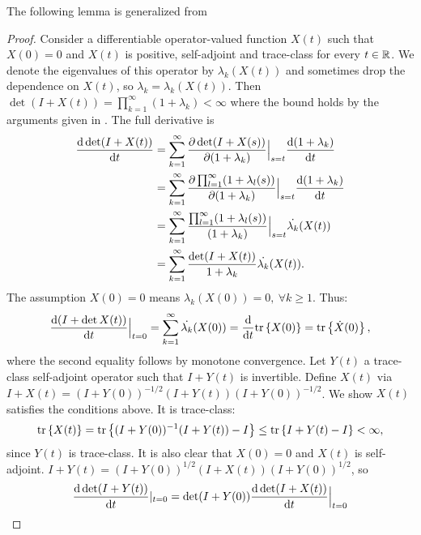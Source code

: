 \documentclass{amsart}
\numberwithin{equation}{section}
\begin{document}
The following lemma is generalized from \cite[Chapter 9,
  Theorem 4, pp. 127]{Lax97}
\lax
\begin{proof}
  Consider a differentiable operator-valued function $X(t)$ such that
  $X(0) = 0$ and $X(t)$ is positive, self-adjoint and trace-class for
  every $t\in \mathbb{R}$. We denote the eigenvalues of this operator by
  $\lambda_k(X(t))$ and sometimes drop the dependence on $X(t)$, so
  $\lambda_k = \lambda_k(X(t))$.  Then $\det (I+X(t)) =
  \prod_{k=1}^{\infty} (1+\lambda_k) < \infty$ where the bound holds
  by the arguments given in \cite{AlexanderianGloorGhattas14}. The
  full derivative is
  \begin{align*}
    \frac{\text{\textup{d}} \det (I+X(t))}{\text{\textup{d}} t} 
    &= \sum_{k=1}^{\infty} 
    \frac{\partial \det (I+X(s))}{\partial (1+\lambda_k)}\Big |_{s=t}
    \frac{\text{\textup{d}} (1+\lambda_k)}{\text{\textup{d}} t} \\
    &= \sum_{k=1}^{\infty} \frac{\partial \prod_{l=1}^{\infty}
      (1+\lambda_l(s))}{\partial (1+\lambda_k)}\Big |_{s=t}
    \frac{\text{\textup{d}} (1+\lambda_k)}{\text{\textup{d}} t} \\
    &= \sum_{k=1}^{\infty} \frac{\prod_{l=1}^{\infty}
      (1+\lambda_l(s))}{(1+\lambda_k)}\Big |_{s=t}
    \dot{\lambda_k}(X(t)) \\
    &= \sum_{k=1}^{\infty} \frac{\det (I+X(t))}{1 +\lambda_k} \dot{\lambda_k}(X(t)).
  \end{align*}
  The assumption $X(0) = 0$ means $\lambda_k(X(0)) = 0,\ \forall k \geq 1$. Thus:
  \begin{align*}
    \frac{\text{\textup{d}} (I+\det X(t))}{\text{\textup{d}} t}\Big |_{t=0} 
    = \sum_{k=1}^{\infty} \dot{\lambda_k}(X(0)) 
    = \frac{\text{\textup{d}} }{\text{\textup{d}} t}\textup{tr}\left \{X(0) \right \}
    = \textup{tr}\left \{\dot{X}(0) \right \},
  \end{align*}
  where the second equality follows by monotone convergence. 
  Let $Y(t)$ a trace-class self-adjoint operator such that 
  $I+Y(t)$ is invertible.
  Define $X(t)$ via $I+X(t) = (I+Y(0))^{-1/2} (I+Y(t)) (I+Y(0))^{-1/2}$. 
  We show $X(t)$ satisfies the conditions above. It is trace-class:
  \begin{align*}
    \textup{tr}\left \{X(t) \right \} = \textup{tr}\left \{(I+Y(0))^{-1} (I+Y(t)) - I \right \}
    \leq \textup{tr}\left \{I+Y(t) - I \right \}< \infty,
  \end{align*}
  since $Y(t)$ is trace-class. It is also clear that
  $X(0) = 0$ and $X(t)$ is self-adjoint.
  $I+Y(t) = (I+Y(0))^{1/2}(I+X(t))(I+Y(0))^{1/2}$, so
  \begin{align*}
    \frac{\der \det (I+Y(t))}{\der t}|_{t=0} 
    &= \det (I+Y(0))\frac{\der \det (I+X(t))}{\der t}\Big |_{t=0} \\

\end{align*}
\end{proof}
\end{document}
